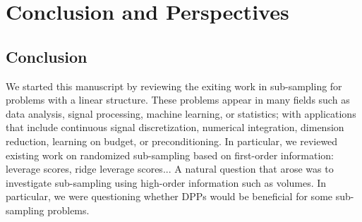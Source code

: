 \documentclass[twoside,11pt]{book}
\numberwithin{theorem}{chapter}
\numberwithin{definition}{chapter}
\numberwithin{proposition}{chapter}
\numberwithin{corollary}{chapter}
\numberwithin{example}{chapter}
\numberwithin{lemma}{chapter}
\numberwithin{assumption}{chapter}
\numberwithin{equation}{chapter}
\numberwithin{figure}{chapter}
\begin{document}


\chapter{Conclusion and Perspectives}\label{chap:conclusion}

\section{Conclusion}


We started this manuscript by reviewing the exiting work in sub-sampling for problems with a linear structure. These problems appear in many fields such as data analysis, signal processing, machine learning, or statistics; with applications that include continuous signal discretization, numerical integration, dimension reduction, learning on budget, or preconditioning. In particular, we reviewed existing work on randomized sub-sampling based on first-order information: leverage scores, ridge leverage scores... A natural question that arose was to investigate sub-sampling using high-order information such as volumes. In particular, we were questioning whether DPPs would be beneficial for some sub-sampling problems. 



 
\end{document}
